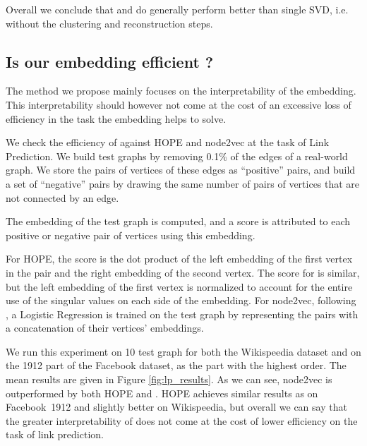 Overall we conclude that \newembLeft{} and \newembRight{} do generally perform better than single SVD, i.e. without the clustering and reconstruction steps.

\subsection{Is our embedding efficient ?}
The method we propose mainly focuses on the interpretability of the embedding. This interpretability should however not come at the cost of an excessive loss of efficiency in the task the embedding helps to solve.

We check the efficiency of \parfaite{} against HOPE and node2vec at the task of Link Prediction. We build test graphs by removing 0.1\% of the edges of a real-world graph. We store the pairs of vertices of these edges as “positive” pairs, and build a set of “negative” pairs by drawing the same number of pairs of vertices that are not connected by an edge.

The embedding of the test graph is computed, and a score is attributed to each positive or negative pair of vertices using this embedding.

For HOPE, the score is the dot product of the left embedding of the first vertex in the pair and the right embedding of the second vertex. The score for \parfaite{} is similar, but the left embedding of the first vertex is normalized to account for the entire use of the singular values on each side of the embedding. For node2vec, following \cite{groverNode2vecScalableFeature2016}, a Logistic Regression is trained on the test graph by representing the pairs with a concatenation of their vertices' embeddings.

We run this experiment on 10 test graph for both the Wikispeedia dataset and on the 1912 part of the Facebook dataset, as the part with the highest order. The mean results are given in Figure \ref{fig:lp_results}. As we can see, node2vec is outperformed by both HOPE and \parfaite{}. HOPE achieves similar results as \parfaite{} on Facebook~1912 and slightly better on Wikispeedia, but overall we can say that the greater interpretability of \parfaite{} does not come at the cost of lower efficiency on the task of link prediction.

